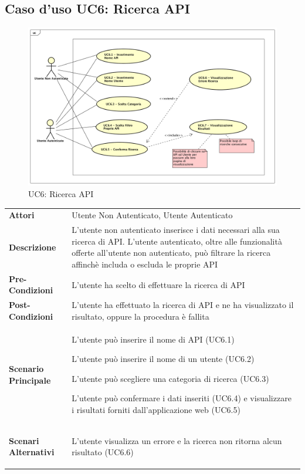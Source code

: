 \newpage
\subsection{Caso d'uso UC6:  Ricerca API }
\label{UC6}
\begin{figure}[ht]
	\centering
	\includegraphics[scale=0.45]{UML/UC6.png}
	\caption{UC6: Ricerca API }
\end{figure}

\begin{longtable}{ l | p{11cm}}
	\hline
	\rowcolor{Gray}
	 \multicolumn{2}{c}{UC6 - Ricerca API} \\
	 \hline
	\textbf{Attori} & Utente Non Autenticato, Utente Autenticato \\
	\textbf{Descrizione} & L'utente non autenticato inserisce i dati necessari alla sua ricerca di API. L'utente autenticato, oltre alle funzionalità offerte all'utente non autenticato, può filtrare la ricerca affinchè includa o escluda le proprie API \\
	\textbf{Pre-Condizioni} & L'utente ha scelto di effettuare la ricerca di API \\
	\textbf{Post-Condizioni} & L'utente ha effettuato la ricerca di API e ne ha visualizzato il risultato, oppure la procedura è fallita \\
	\textbf{Scenario Principale} & 
	\begin{enumerate*}[label=(\arabic*.),itemjoin={\newline}]
		\item L'utente può inserire il nome di API (UC6.1)
		\item L'utente può inserire il nome di un utente (UC6.2)
		\item L'utente può scegliere una categoria di ricerca (UC6.3)
		\item L'utente può confermare i dati inseriti (UC6.4) e visualizzare i risultati forniti dall'applicazione web (UC6.5)
	\end{enumerate*}\\
	\textbf{Scenari Alternativi} & 
	\begin{enumerate*}[label=(\arabic*.),itemjoin={\newline}]
		\item L'utente visualizza un errore e la ricerca non ritorna alcun risultato (UC6.6) 
	\end{enumerate*}\\
\end{longtable}